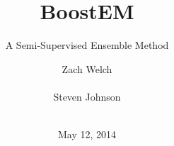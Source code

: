 \documentclass{sig-alternate}
\begin{document}
%

\title{BoostEM}
\subtitle{A Semi-Supervised Ensemble Method}
%
%
%
%
%

%
\author{
%
%
\alignauthor
Zach Welch\\
       \\
\alignauthor
Steven Johnson\\
       \\
}
\date{May 12, 2014}
\end{document}
